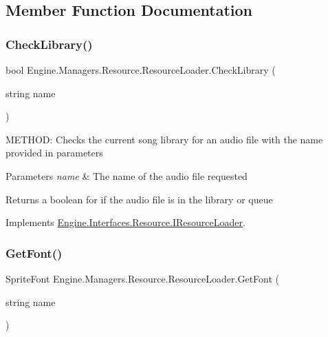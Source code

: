\subsection{Member Function Documentation}
\mbox{\label{a00530_a939824a1d16e96b4322225a18f7a47d6}} 
\subsubsection{\texorpdfstring{Check\+Library()}{CheckLibrary()}}
{\footnotesize\ttfamily bool Engine.\+Managers.\+Resource.\+Resource\+Loader.\+Check\+Library (\begin{DoxyParamCaption}\item[{string}]{name }\end{DoxyParamCaption})\hspace{0.3cm}{\ttfamily [inline]}}



M\+E\+T\+H\+OD\+: Checks the current song library for an audio file with the name provided in parameters 


\begin{DoxyParams}{Parameters}
{\em name} & The name of the audio file requested\\
\hline
\end{DoxyParams}
\begin{DoxyReturn}{Returns}
a boolean for if the audio file is in the library or queue
\end{DoxyReturn}


Implements \hyperlink{a00462_a08d51ffa3d65fd1122614e00a275cf48}{Engine.\+Interfaces.\+Resource.\+I\+Resource\+Loader}.

\mbox{\label{a00530_a160f06963928da598da9f9431ba65f73}} 
\subsubsection{\texorpdfstring{Get\+Font()}{GetFont()}}
{\footnotesize\ttfamily Sprite\+Font Engine.\+Managers.\+Resource.\+Resource\+Loader.\+Get\+Font (\begin{DoxyParamCaption}\item[{string}]{name }\end{DoxyParamCaption})\hspace{0.3cm}{\ttfamily [inline]}}



